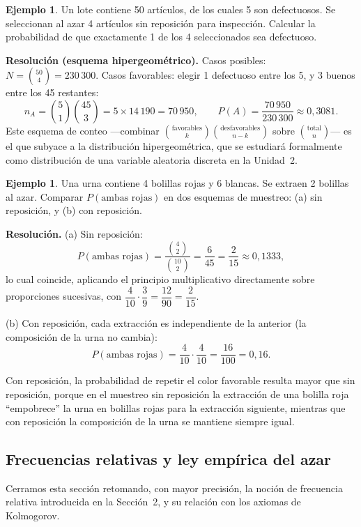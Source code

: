 \documentclass[11pt,a4paper]{article}
\theoremstyle{plain}
\theoremstyle{definition}
\newtheorem{ejemplo}[teorema]{Ejemplo}
\theoremstyle{remark}
\begin{document}
\begin{ejemplo}
Un lote contiene 50 artículos, de los cuales 5 son defectuosos. Se seleccionan al azar 4 artículos sin reposición para inspección. Calcular la probabilidad de que exactamente 1 de los 4 seleccionados sea defectuoso.
\end{ejemplo}

\textbf{Resolución (esquema hipergeométrico).} Casos posibles: $N=\binom{50}{4} = 230\,300$. Casos favorables: elegir 1 defectuoso entre los 5, y 3 buenos entre los 45 restantes:
\[
n_A = \binom{5}{1}\binom{45}{3} = 5 \times 14\,190 = 70\,950, \qquad P(A) = \frac{70\,950}{230\,300} \approx 0{,}3081.
\]
Este esquema de conteo —combinar $\binom{\text{favorables}}{k}\binom{\text{desfavorables}}{n-k}$ sobre $\binom{\text{total}}{n}$— es el que subyace a la distribución hipergeométrica, que se estudiará formalmente como distribución de una variable aleatoria discreta en la Unidad~2.

\begin{ejemplo}
Una urna contiene 4 bolillas rojas y 6 blancas. Se extraen 2 bolillas al azar. Comparar $P(\text{ambas rojas})$ en dos esquemas de muestreo: (a) sin reposición, y (b) con reposición.
\end{ejemplo}

\textbf{Resolución.} (a) Sin reposición:
\[
P(\text{ambas rojas}) = \frac{\binom{4}{2}}{\binom{10}{2}} = \frac{6}{45} = \frac{2}{15}\approx 0{,}1333,
\]
lo cual coincide, aplicando el principio multiplicativo directamente sobre proporciones sucesivas, con $\dfrac{4}{10}\cdot\dfrac{3}{9} = \dfrac{12}{90}=\dfrac{2}{15}$.

(b) Con reposición, cada extracción es independiente de la anterior (la composición de la urna no cambia):
\[
P(\text{ambas rojas}) = \frac{4}{10}\cdot\frac{4}{10} = \frac{16}{100} = 0{,}16.
\]

Con reposición, la probabilidad de repetir el color favorable resulta mayor que sin reposición, porque en el muestreo sin reposición la extracción de una bolilla roja ``empobrece'' la urna en bolillas rojas para la extracción siguiente, mientras que con reposición la composición de la urna se mantiene siempre igual.

\subsection{Frecuencias relativas y ley empírica del azar}

Cerramos esta sección retomando, con mayor precisión, la noción de frecuencia relativa introducida en la Sección~2, y su relación con los axiomas de Kolmogorov.
\end{document}
